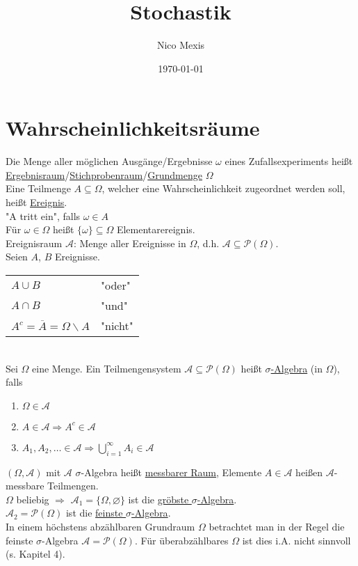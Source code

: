 \documentclass[a4paper]{article}
\title{Stochastik}
\author{Nico Mexis}
\date{\today}
\newcommand{\ul}{\underline}
\begin{document}
\maketitle
\newpage

\tableofcontents
\newpage

\section{Wahrscheinlichkeitsräume}
Die Menge aller möglichen Ausgänge/Ergebnisse $\omega$ eines Zufallsexperiments heißt \ul{Ergebnisraum}/\ul{Stichprobenraum}/\ul{Grundmenge} $\Omega$\\
Eine Teilmenge $A\subseteq \Omega$, welcher eine Wahrscheinlichkeit zugeordnet werden soll, heißt \ul{Ereignis}.\\
"A tritt ein", falls $\omega\in A$\\
Für $\omega\in\Omega$ heißt $\{\omega\}\subseteq\Omega$ Elementarereignis.\\
Ereignisraum $\mathcal{A}$: Menge aller Ereignisse in $\Omega$, d.h. $\mathcal{A}\subseteq\mathcal{P}(\Omega)$.\\
Seien $A$, $B$ Ereignisse.\\
\begin{tabular}{ll}
$A\cup B$ & "oder"\\
$A\cap B$ & "und"\\
$A^c=\overline{A}=\Omega\backslash A$ & "nicht"
\end{tabular}\\
Sei $\Omega$ eine Menge. Ein Teilmengensystem $\mathcal{A}\subseteq\mathcal{P}(\Omega)$ heißt \ul{$\sigma$-Algebra} (in $\Omega$), falls
\begin{enumerate}[1)]
	\item $\Omega\in\mathcal{A}$
	\item $A\in\mathcal{A}\Rightarrow A^c\in\mathcal{A}$
	\item $A_1,A_2,\dots\in \mathcal{A}\Rightarrow \bigcup_{i=1}^\infty A_i\in\mathcal{A}$
\end{enumerate}
$(\Omega,\mathcal{A})$ mit $\mathcal{A}$ $\sigma$-Algebra heißt \ul{messbarer Raum}, Elemente $A\in\mathcal{A}$ heißen $\mathcal{A}$-messbare Teilmengen.\\
$\Omega$ beliebig $\Rightarrow$ $\mathcal{A}_1=\{\Omega,\varnothing\}$ ist die \ul{gröbste $\sigma$-Algebra}.\\
$\mathcal{A}_2=\mathcal{P}(\Omega)$ ist die \ul{feinste $\sigma$-Algebra}.\\
In einem höchstens abzählbaren Grundraum $\Omega$ betrachtet man in der Regel die feinste $\sigma$-Algebra $\mathcal{A}=\mathcal{P}(\Omega)$. Für überabzählbares $\Omega$ ist dies i.A. nicht sinnvoll (s. Kapitel 4).\\
\end{document}
